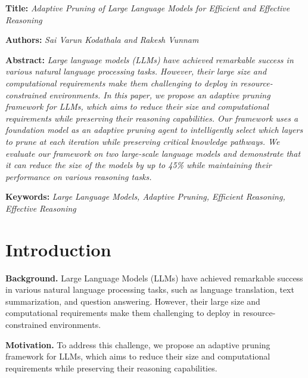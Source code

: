 \documentclass{article}
\begin{document}
        \begin{titlepage}
        \centering
        \Large
        \textbf{Title:} \textit{Adaptive Pruning of Large Language Models for Efficient and Effective Reasoning}

        \vspace{1cm}
        \large
        \textbf{Authors:} \textit{Sai Varun Kodathala and Rakesh Vunnam}

        \vspace{1cm}
        \large
        \textbf{Abstract:} \textit{Large language models (LLMs) have achieved remarkable success in various natural language processing tasks. However, their large size and computational requirements make them challenging to deploy in resource-constrained environments. In this paper, we propose an adaptive pruning framework for LLMs, which aims to reduce their size and computational requirements while preserving their reasoning capabilities. Our framework uses a foundation model as an adaptive pruning agent to intelligently select which layers to prune at each iteration while preserving critical knowledge pathways. We evaluate our framework on two large-scale language models and demonstrate that it can reduce the size of the models by up to 45\% while maintaining their performance on various reasoning tasks.}

        \vspace{1cm}
        \large
        \textbf{Keywords:} \textit{Large Language Models, Adaptive Pruning, Efficient Reasoning, Effective Reasoning}

        \end{titlepage}

        \section{Introduction}
        \label{sec:intro}
        \setlength{\parindent}{0pt}
        \textbf{Background.} Large Language Models (LLMs) have achieved remarkable success in various natural language processing tasks, such as language translation, text summarization, and question answering. However, their large size and computational requirements make them challenging to deploy in resource-constrained environments.

        \textbf{Motivation.} To address this challenge, we propose an adaptive pruning framework for LLMs, which aims to reduce their size and computational requirements while preserving their reasoning capabilities.
\end{document}
